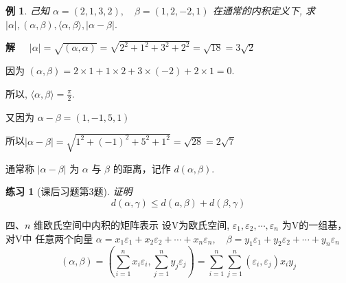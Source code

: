 \documentclass[13pt]{beamer}
\newtheorem{exa}{例}
\newtheorem*{ex}{练习}
\begin{document}
\begin{frame}
	\begin{exa}己知 $\alpha=(2,1,3,2), \quad \beta=(1,2,-2,1)$
	在通常的内积定义下, 求 $|\alpha|,(\alpha, \beta),\langle\alpha, \beta\rangle,|\alpha-\beta| .$
	\end{exa}
	\pause
{\bf 解~~} 
$|\alpha|=\sqrt{(\alpha, \alpha)}=\sqrt{2^{2}+1^{2}+3^{2}+2^{2}}=\sqrt{18}=3 \sqrt{2}$

因为 $(\alpha, \beta)=2 \times 1+1 \times 2+3 \times(-2)+2 \times 1=0$. 

所以, $\langle\alpha, \beta\rangle=\frac{\pi}{2}$.

又因为 $\alpha-\beta=(1,-1,5,1)$

所以$|\alpha-\beta|=\sqrt{1^{2}+(-1)^{2}+5^{2}+1^{2}}=\sqrt{28}=2 \sqrt{7}$
\end{frame}
\begin{frame}
	通常称 $|\alpha-\beta|$ 为 $\alpha$ 与 $\beta$ 的距离，记作 $d(\alpha, \beta)$.
\begin{ex}[{课后习题第3题}]
证明
$$d(\alpha, {\gamma}) \leqslant d({a}, {\beta})+d({\beta}, {\gamma})$$
\end{ex}

\end{frame}


\begin{frame}
{四、$n$ 维欧氏空间中内积的矩阵表示}
设V为欧氏空间, $\varepsilon_{1}, \varepsilon_{2}, \cdots, \varepsilon_{n}$ 为V的一组基，对V中
任意两个向量
$\alpha=x_{1} \varepsilon_{1}+x_{2} \varepsilon_{2}+\cdots+x_{n} \varepsilon_{n}, \quad
\beta=y_{1} \varepsilon_{1}+y_{2} \varepsilon_{2}+\cdots+y_{n} \varepsilon_{n}$
$$
(\alpha, \beta)=\left(\sum_{i=1}^{n} x_{i} \varepsilon_{i}, \sum_{j=1}^{n} y_{j} \varepsilon_{j}\right)=\sum_{i=1}^{n} \sum_{j=1}^{n}\left(\varepsilon_{i}, \varepsilon_{j}\right) x_{i} y_{j} $$
\end{frame}
\end{document}
